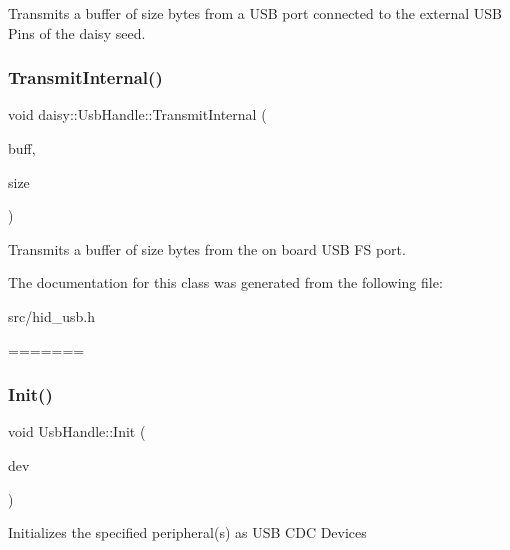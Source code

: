 Transmits a buffer of \textquotesingle{}size\textquotesingle{} bytes from a U\+SB port connected to the external U\+SB Pins of the daisy seed. \mbox{\label{classdaisy_1_1_usb_handle_aaff1689cd8310f0b741829d6568f2ad0}} 
\subsubsection{\texorpdfstring{Transmit\+Internal()}{TransmitInternal()}}
{\footnotesize\ttfamily void daisy\+::\+Usb\+Handle\+::\+Transmit\+Internal (\begin{DoxyParamCaption}\item[{uint8\+\_\+t $\ast$}]{buff,  }\item[{size\+\_\+t}]{size }\end{DoxyParamCaption})}

Transmits a buffer of \textquotesingle{}size\textquotesingle{} bytes from the on board U\+SB FS port. 

The documentation for this class was generated from the following file\+:\begin{DoxyCompactItemize}
\item 
src/hid\+\_\+usb.\+h\end{DoxyCompactItemize}
=======
\mbox{\label{classdaisy_1_1_usb_handle_a0e30c290afb4d303ecf3b0c83d71f24d}} 
\subsubsection{\texorpdfstring{Init()}{Init()}}
{\footnotesize\ttfamily void Usb\+Handle\+::\+Init (\begin{DoxyParamCaption}\item[{\hyperlink{classdaisy_1_1_usb_handle_ad2a37421ade061875a30765e2b2e1318}{Usb\+Periph}}]{dev }\end{DoxyParamCaption})}

Initializes the specified peripheral(s) as U\+SB C\+DC Devices \mbox{\label{classdaisy_1_1_usb_handle_ab8a881e946f264682ccb34a3b79ef55d}} 
